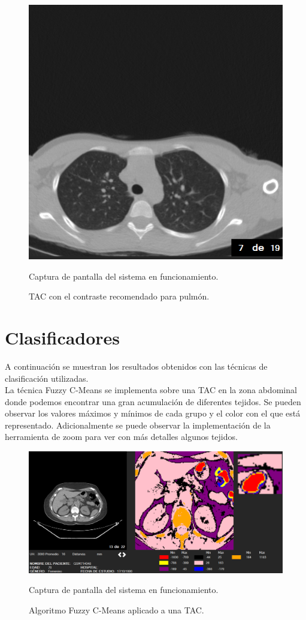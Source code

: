 \documentclass[12pt]{report}
\begin{document}
\begin{figure}[H]
\centering
\includegraphics[width = 7 cm, height = 7 cm]{contrastePulmon}
\caption{TAC con el contraste recomendado para pulmón.}
Captura de pantalla del sistema en funcionamiento.
\end{figure}

\section{Clasificadores}
A continuación se muestran los resultados obtenidos con las técnicas de clasificación utilizadas.\\

La técnica Fuzzy C-Means se implementa sobre una TAC en la zona abdominal donde podemos encontrar una gran acumulación de diferentes tejidos. Se pueden observar los valores máximos y mínimos de cada grupo y el color con el que está representado. Adicionalmente se puede observar la implementación de la herramienta de zoom para ver con más detalles algunos tejidos.

\vspace{1cm}
\begin{figure}[H]
\centering
\includegraphics[width = 15 cm, height = 10 cm]{clusterCfuzzy}
\caption{Algoritmo Fuzzy C-Means aplicado a una TAC.}
Captura de pantalla del sistema en funcionamiento.
\end{figure}
\end{document}
